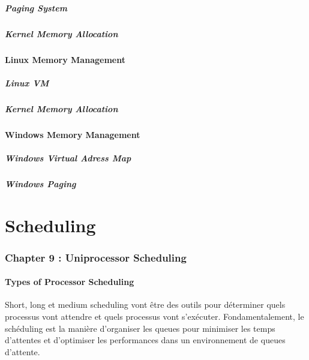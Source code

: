 \subsubsection{Paging System}
\subsubsection{Kernel Memory Allocation}
\subsection{Linux Memory Management}
\subsubsection{Linux VM}
\subsubsection{Kernel Memory Allocation}
\subsection{Windows Memory Management}
\subsubsection{Windows Virtual Adress Map }
\subsubsection{Windows Paging}


\newpage
\part{Scheduling}


\section{Chapter 9 : Uniprocessor Scheduling}

\subsection{Types of Processor Scheduling}
Short, long et medium scheduling vont être des outils pour déterminer quels processus vont attendre et quels processus vont s'exécuter. Fondamentalement, le schéduling est la manière d'organiser les queues pour minimiser les temps d'attentes et d'optimiser les performances dans un environnement de queues d'attente.
